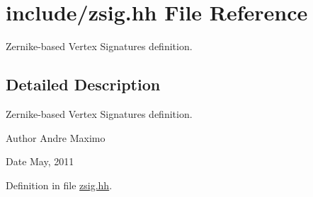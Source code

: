 \hypertarget{zsig_8hh}{
\section{include/zsig.hh File Reference}
\label{zsig_8hh}
}


Zernike-\/based Vertex Signatures definition.  




\subsection{Detailed Description}
Zernike-\/based Vertex Signatures definition. \begin{DoxyAuthor}{Author}
Andre Maximo 
\end{DoxyAuthor}
\begin{DoxyDate}{Date}
May, 2011 
\end{DoxyDate}


Definition in file \hyperlink{zsig_8hh_source}{zsig.hh}.

